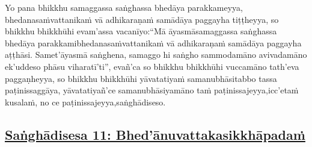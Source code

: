 Yo pana bhikkhu samaggassa saṅghassa bhedāya parakkameyya, bhedanasaṁvattanikaṁ vā adhikaraṇaṁ samādāya paggayha tiṭṭheyya, so bhikkhu bhikkhūhi evam'assa vacanīyo:\makeatletter\hyperlink{endnote66-appendix}\makeatother \thinspace ``Mā āyasmā\makeatletter\hyperlink{endnote67-appendix}\makeatother \thinspace samaggassa saṅghassa bhedāya parakkami\makeatletter\hyperlink{endnote68-appendix}\makeatother \thinspace bhedanasaṁvattanikaṁ vā adhikaraṇaṁ samādāya paggayha aṭṭhāsi. Samet'āyasmā saṅghena, samaggo hi saṅgho sammodamāno avivadamāno ek'uddeso phāsu viharatī'ti'', evañ'ca so bhikkhu bhikkhūhi vuccamāno tath'eva paggaṇheyya, so bhikkhu bhikkhūhi yāvatatiyaṁ samanubhāsitabbo tassa paṭinissaggāya, yāvatatiyañ'ce samanubhāsiyamāno taṁ paṭinissajeyya,\makeatletter\hyperlink{endnote69-appendix}\makeatother \thinspace icc'etaṁ kusalaṁ, no ce paṭinissajeyya,\makeatletter\hyperlink{endnote70-appendix}\makeatother \thinspace saṅghādiseso.



\subsection*{\hyperref[comm11]{Saṅghādisesa 11: Bhed'ānuvattakasikkhāpadaṁ}}
\label{sd11}

